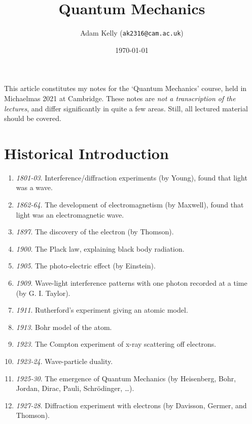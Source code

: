 \documentclass[a4paper]{scrartcl}
\title{Quantum Mechanics}
\author{Adam Kelly (\texttt{ak2316@cam.ac.uk})}
\date{\today}
\begin{document}
\maketitle


This article constitutes my notes for the `Quantum Mechanics' course, held in Michaelmas 2021 at Cambridge. These notes are \emph{not a transcription of the lectures}, and differ significantly in quite a few areas. Still, all lectured material should be covered.



\tableofcontents

\section{Historical Introduction}

\begin{enumerate}
    \item \emph{1801-03}. Interference/diffraction experiments (by Young), found that light was a wave.
    \item \emph{1862-64}. The development of electromagnetism (by Maxwell), found that light was an electromagnetic wave.
    \item \emph{1897}. The discovery of the electron (by Thomson).
    \item \emph{1900}. The Plack law, explaining black body radiation. 
    \item \emph{1905}. The photo-electric effect (by Einstein).
    \item \emph{1909}. Wave-light interference patterns with one photon recorded at a time (by G. I. Taylor).
    \item \emph{1911}. Rutherford's experiment giving an atomic model.
    \item \emph{1913}. Bohr model of the atom.
    \item \emph{1923}. The Compton experiment of x-ray scattering off electrons.
    \item \emph{1923-24}. Wave-particle duality.
    \item \emph{1925-30}. The emergence of Quantum Mechanics (by Heisenberg, Bohr, Jordan, Dirac, Pauli, Schrödinger, \dots).
    \item \emph{1927-28}. Diffraction experiment with electrons (by Davisson, Germer, and Thomson).
\end{enumerate}
\end{document}
